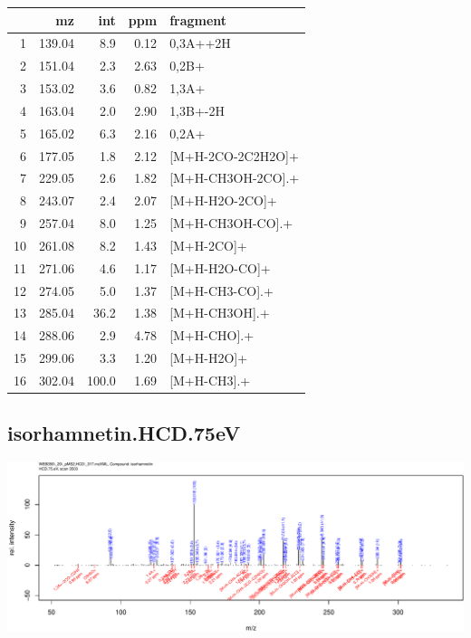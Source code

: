 \documentclass[]{article}
\begin{document}
\begin{table}[ht]
\centering
\begin{tabular}{rrrrl}
  \toprule
 & mz & int & ppm & fragment \\ 
  \midrule
1 & 139.04 & 8.9 & 0.12 & 0,3A++2H \\ 
  2 & 151.04 & 2.3 & 2.63 & 0,2B+ \\ 
  3 & 153.02 & 3.6 & 0.82 & 1,3A+ \\ 
  4 & 163.04 & 2.0 & 2.90 & 1,3B+-2H \\ 
  5 & 165.02 & 6.3 & 2.16 & 0,2A+ \\ 
  6 & 177.05 & 1.8 & 2.12 & [M+H-2CO-2C2H2O]+ \\ 
  7 & 229.05 & 2.6 & 1.82 & [M+H-CH3OH-2CO].+ \\ 
  8 & 243.07 & 2.4 & 2.07 & [M+H-H2O-2CO]+ \\ 
  9 & 257.04 & 8.0 & 1.25 & [M+H-CH3OH-CO].+ \\ 
  10 & 261.08 & 8.2 & 1.43 & [M+H-2CO]+ \\ 
  11 & 271.06 & 4.6 & 1.17 & [M+H-H2O-CO]+ \\ 
  12 & 274.05 & 5.0 & 1.37 & [M+H-CH3-CO].+ \\ 
  13 & 285.04 & 36.2 & 1.38 & [M+H-CH3OH].+ \\ 
  14 & 288.06 & 2.9 & 4.78 & [M+H-CHO].+ \\ 
  15 & 299.06 & 3.3 & 1.20 & [M+H-H2O]+ \\ 
  16 & 302.04 & 100.0 & 1.69 & [M+H-CH3].+ \\ 
   \bottomrule
\end{tabular}
\end{table}

\clearpage\subsection{isorhamnetin.HCD.75eV}
\includegraphics[width=\textwidth]{WEB350_files/figure-latex/unnamed-chunk-3-41}
\end{document}
